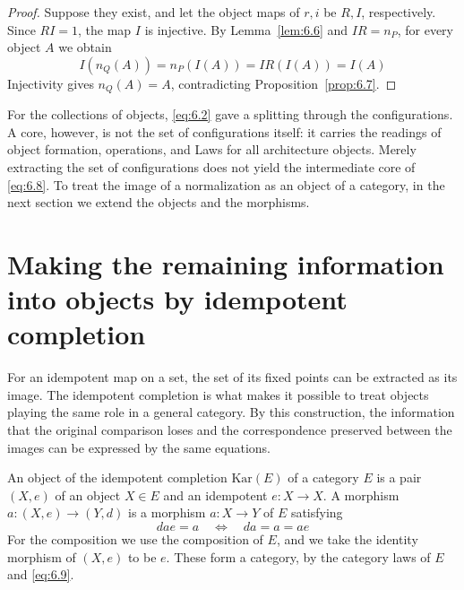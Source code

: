 \begin{proof}

Suppose they exist, and let the object maps of $r,i$ be $R,I$, respectively.
Since $RI=1$, the map $I$ is injective.
By Lemma~\ref{lem:6.6} and $IR=n_P$, for every object $A$ we obtain
\[
I(n_Q(A))=n_P(I(A))=IR(I(A))=I(A)
\]
Injectivity gives $n_Q(A)=A$, contradicting Proposition~\ref{prop:6.7}.

\end{proof}

For the collections of objects, \eqref{eq:6.2} gave a splitting through the configurations.
A core, however, is not the set of configurations itself: it carries the readings of object
formation, operations, and Laws for all architecture objects. Merely extracting the set of
configurations does not yield the intermediate core of \eqref{eq:6.8}.
To treat the image of a normalization as an object of a category, in the next section we
extend the objects and the morphisms.

\section{Making the remaining information into objects by idempotent completion}\label{sec:6.3}

For an idempotent map on a set, the set of its fixed points can be extracted as its image.
The idempotent completion is what makes it possible to treat objects playing the same role
in a general category.
By this construction, the information that the original comparison loses and the
correspondence preserved between the images can be expressed by the same equations.

\begin{definition}\label{def:6.9}

An object of the idempotent completion $\mathrm{Kar}(E)$ of a category $E$ is a pair
$(X,e)$ of an object $X\in E$ and an idempotent $e:X\to X$.
A morphism $a:(X,e)\to(Y,d)$ is a morphism $a:X\to Y$ of $E$ satisfying
\begin{equation*}
dae=a
\quad\Longleftrightarrow\quad
da=a=ae
\tag{6.9}\label{eq:6.9}
\end{equation*}
For the composition we use the composition of $E$, and we take the identity morphism of
$(X,e)$ to be $e$.
These form a category, by the category laws of $E$ and \eqref{eq:6.9}.

\end{definition}

